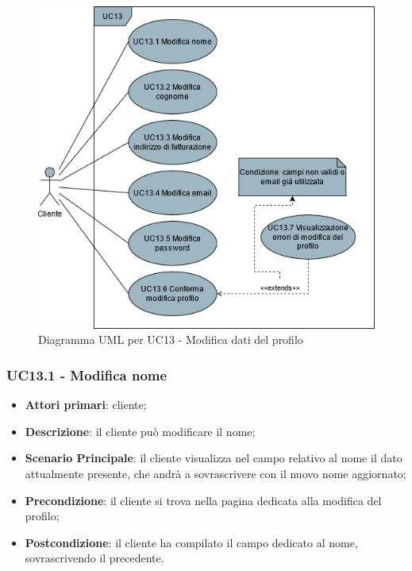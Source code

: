 \begin{figure}[H]
\centering
\includegraphics[scale=0.6]{res/UseCase/Immagini/ModificaProfilo}
\caption{Diagramma UML per UC13 - Modifica dati del profilo}
\end{figure}

\subsubsection{UC13.1 - Modifica nome}
\begin{itemize}
\item \textbf{Attori primari}: cliente;
\item \textbf{Descrizione}: il cliente può modificare il nome;
\item \textbf{Scenario Principale}: il cliente visualizza nel campo relativo al nome il dato attualmente presente, che andrà a sovrascrivere con il nuovo nome aggiornato;
\item \textbf{Precondizione}: il cliente si trova nella pagina dedicata alla modifica del profilo;
\item \textbf{Postcondizione}: il cliente ha compilato il campo dedicato al nome, sovrascrivendo il precedente.
\end{itemize}

